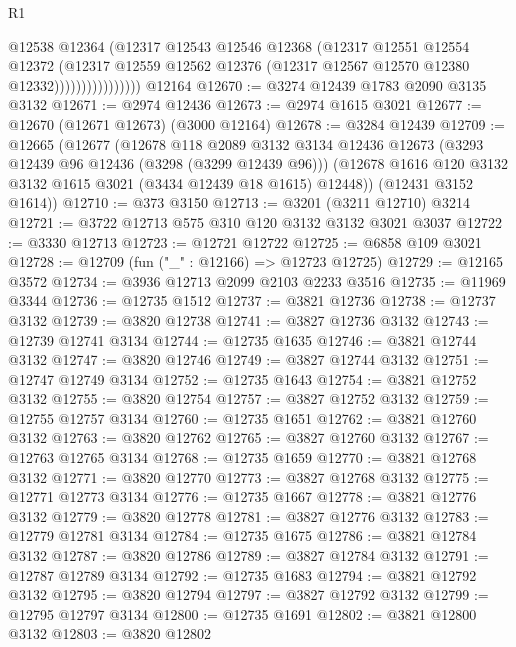 \begin{lexlean}{R1}
\begin{coremodule}
                            @12538
                            @12364
                            (@12317
                              @12543
                              @12546
                              @12368
                              (@12317
                                @12551
                                @12554
                                @12372
                                (@12317
                                  @12559
                                  @12562
                                  @12376
                                  (@12317 @12567 @12570 @12380 @12332))))))))))))))))
    @12164
@12670 := @3274 @12439 @1783 @2090 @3135 @3132
@12671 := @2974 @12436
@12673 := @2974 @1615 @3021
@12677 := @12670 (@12671 @12673) (@3000 @12164)
@12678 := @3284 @12439
@12709 := @12665
    (@12677
      (@12678
        @118
        @2089
        @3132
        @3134
        @12436
        @12673
        (@3293 @12439 @96 @12436 (@3298 (@3299 @12439 @96)))
        (@12678 @1616 @120 @3132 @3132 @1615 @3021 (@3434 @12439 @18 @1615) @12448))
      (@12431 @3152 @1614))
@12710 := @373 @3150
@12713 := @3201 (@3211 @12710) @3214
@12721 := @3722 @12713 @575 @310 @120 @3132 @3132 @3021 @3037
@12722 := @3330 @12713
@12723 := @12721 @12722
@12725 := @6858 @109 @3021
@12728 := @12709 (fun ("_" : @12166) => @12723 @12725)
@12729 := @12165 @3572
@12734 := @3936 @12713 @2099 @2103 @2233 @3516
@12735 := @11969 @3344
@12736 := @12735 @1512
@12737 := @3821 @12736
@12738 := @12737 @3132
@12739 := @3820 @12738
@12741 := @3827 @12736 @3132
@12743 := @12739 @12741 @3134
@12744 := @12735 @1635
@12746 := @3821 @12744 @3132
@12747 := @3820 @12746
@12749 := @3827 @12744 @3132
@12751 := @12747 @12749 @3134
@12752 := @12735 @1643
@12754 := @3821 @12752 @3132
@12755 := @3820 @12754
@12757 := @3827 @12752 @3132
@12759 := @12755 @12757 @3134
@12760 := @12735 @1651
@12762 := @3821 @12760 @3132
@12763 := @3820 @12762
@12765 := @3827 @12760 @3132
@12767 := @12763 @12765 @3134
@12768 := @12735 @1659
@12770 := @3821 @12768 @3132
@12771 := @3820 @12770
@12773 := @3827 @12768 @3132
@12775 := @12771 @12773 @3134
@12776 := @12735 @1667
@12778 := @3821 @12776 @3132
@12779 := @3820 @12778
@12781 := @3827 @12776 @3132
@12783 := @12779 @12781 @3134
@12784 := @12735 @1675
@12786 := @3821 @12784 @3132
@12787 := @3820 @12786
@12789 := @3827 @12784 @3132
@12791 := @12787 @12789 @3134
@12792 := @12735 @1683
@12794 := @3821 @12792 @3132
@12795 := @3820 @12794
@12797 := @3827 @12792 @3132
@12799 := @12795 @12797 @3134
@12800 := @12735 @1691
@12802 := @3821 @12800 @3132
@12803 := @3820 @12802

\end{coremodule}
\end{lexlean}
